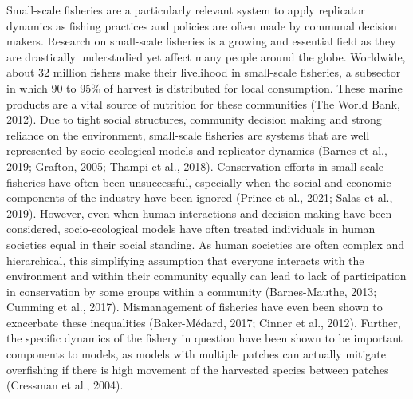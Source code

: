 \documentclass[
]{article}
\begin{document}
Small-scale fisheries are a particularly relevant system to apply replicator dynamics as fishing practices and policies are often made by communal decision makers. Research on small-scale fisheries is a growing and essential field as they are drastically understudied yet affect many people around the globe. Worldwide, about 32 million fishers make their livelihood in small-scale fisheries, a subsector in which 90 to 95\% of harvest is distributed for local consumption. These marine products are a vital source of nutrition for these communities (The World Bank, 2012). Due to tight social structures, community decision making and strong reliance on the environment, small-scale fisheries are systems that are well represented by socio-ecological models and replicator dynamics (Barnes et al., 2019; Grafton, 2005; Thampi et al., 2018). Conservation efforts in small-scale fisheries have often been unsuccessful, especially when the social and economic components of the industry have been ignored (Prince et al., 2021; Salas et al., 2019). However, even when human interactions and decision making have been considered, socio-ecological models have often treated individuals in human societies equal in their social standing. As human societies are often complex and hierarchical, this simplifying assumption that everyone interacts with the environment and within their community equally can lead to lack of participation in conservation by some groups within a community (Barnes-Mauthe, 2013; Cumming et al., 2017). Mismanagement of fisheries have even been shown to exacerbate these inequalities (Baker-Médard, 2017; Cinner et al., 2012). Further, the specific dynamics of the fishery in question have been shown to be important components to models, as models with multiple patches can actually mitigate overfishing if there is high movement of the harvested species between patches (Cressman et al., 2004).
\end{document}
